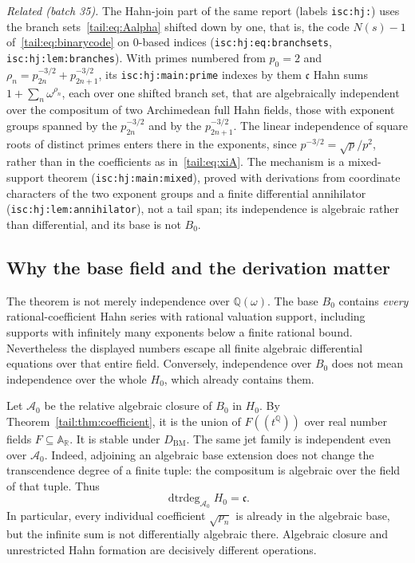 \documentclass[11pt,a4paper]{article}
\numberwithin{equation}{section}
\theoremstyle{definition}
\theoremstyle{remark}
\newcommand{\R}{\mathbb R}
\newcommand{\Q}{\mathbb Q}
\newcommand{\AR}{\mathbb A_{\R}}
\newcommand{\dtrdeg}{\operatorname{dtrdeg}}
\newcommand{\BM}{D_{\mathrm{BM}}}
\newcommand{\cf}{\mathfrak c}
\begin{document}
\emph{Related (batch 35).} The Hahn-join part of the same report (labels
\texttt{isc:hj:}) uses the branch sets~\eqref{tail:eq:Aalpha} shifted down
by one, that is, the code $N(s)-1$ of~\eqref{tail:eq:binarycode} on
$0$-based indices (\texttt{isc:hj:eq:branchsets},
\texttt{isc:hj:lem:branches}). With primes numbered from $p_0=2$ and
$\rho_n=p_{2n}^{-3/2}+p_{2n+1}^{-3/2}$, its \texttt{isc:hj:main:prime}
indexes by them $\cf$ Hahn sums $1+\sum_n\omega^{\rho_n}$, each over one
shifted branch set, that are algebraically independent over the compositum
of two Archimedean full Hahn fields, those with exponent groups spanned by
the $p_{2n}^{-3/2}$ and by the $p_{2n+1}^{-3/2}$. The linear independence of
square roots of distinct primes enters there in the exponents, since
$p^{-3/2}=\sqrt p/p^2$, rather than in the coefficients as
in~\eqref{tail:eq:xiA}. The mechanism is a mixed-support theorem
(\texttt{isc:hj:main:mixed}), proved with derivations from coordinate
characters of the two exponent groups and a finite differential annihilator
(\texttt{isc:hj:lem:annihilator}), not a tail span; its independence is
algebraic rather than differential, and its base is not $B_0$.

\subsection{Why the base field and the derivation matter}
The theorem is not merely independence over $\Q(\omega)$. The base
$B_0$ contains \emph{every} rational-coefficient Hahn series with rational
valuation support, including supports with infinitely many exponents
below a finite rational bound. Nevertheless the displayed numbers escape
all finite algebraic differential equations over that entire field.
Conversely, independence over $B_0$ does not mean independence over the
whole $H_0$, which already contains them.

Let $\mathcal A_0$ be the relative algebraic closure of $B_0$ in $H_0$.
By Theorem~\ref{tail:thm:coefficient}, it is the union of
$F((t^\Q))$ over real number fields $F\subseteq\AR$. It is stable under
$\BM$. The same jet family is independent even over $\mathcal A_0$.
Indeed, adjoining an algebraic base extension does not change the
transcendence degree of a finite tuple: the compositum is algebraic over
the field of that tuple. Thus
\[
 \dtrdeg_{\mathcal A_0}H_0=\cf.
\]
In particular, every individual coefficient $\sqrt{p_n}$ is already in
the algebraic base, but the infinite sum is not differentially algebraic
there. Algebraic closure and unrestricted Hahn formation are decisively
different operations.
\end{document}
